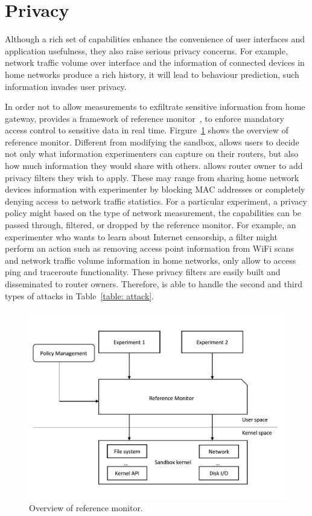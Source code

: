 \section{Privacy}
\label{sec.privacy}
Although a rich set of capabilities enhance the convenience of user interfaces and application usefulness, they also raise serious privacy concerns. For example, network traffic volume over interface and the information of connected devices in home networks produce a rich history, it will lead to behaviour prediction, such information invades user privacy. 

In order not to allow measurements to exfiltrate sensitive information from home gateway, \sysname provides a framework of reference monitor~\cite{ref}, to enforce mandatory access control to sensitive data in real time. Firgure~\ref{fig-reference} shows the overview of reference monitor. Different from modifying the sandbox, \sysname allows users to decide not only what information experimenters can capture on their routers, but also how much information they would share with others. \sysname allows router owner to add privacy filters they wish to apply. These may range from sharing home network devices information with experimenter by blocking MAC addresses or completely denying access to network traffic statistics. For a particular experiment, a privacy policy might based on the type of network measurement, the capabilities can be passed through, filtered, or dropped by the reference monitor. For example, an experimenter who wants to learn about Internet censorship, a filter might perform an action such as removing access point information from WiFi scans and network traffic volume information in home networks, only allow to access ping and traceroute functionality. These privacy filters are easily built and disseminated to router owners. Therefore, \sysname is able to handle the second and third types of attacks in Table~\ref{table: attack}. 

\begin{figure}%
\centering
\includegraphics[width=0.8\columnwidth]{figure/referencemonitor.png}
\caption{Overview of reference monitor.}
\label{fig-reference}
\end{figure}

